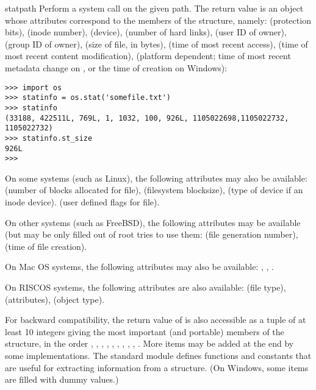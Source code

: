 \begin{funcdesc}{stat}{path}
Perform a  system call on the given path.  The
return value is an object whose attributes correspond to the members of
the  structure, namely:
 (protection bits),
 (inode number),
 (device),
 (number of hard links),
 (user ID of owner),
 (group ID of owner),
 (size of file, in bytes),
 (time of most recent access),
 (time of most recent content modification),
(platform dependent; time of most recent metadata change on \UNIX, or
the time of creation on Windows):

\begin{verbatim}
>>> import os
>>> statinfo = os.stat('somefile.txt')
>>> statinfo
(33188, 422511L, 769L, 1, 1032, 100, 926L, 1105022698,1105022732, 1105022732)
>>> statinfo.st_size
926L
>>>
\end{verbatim}


On some \UNIX{} systems (such as Linux), the following attributes may
also be available:
 (number of blocks allocated for file),
 (filesystem blocksize),
 (type of device if an inode device).
 (user defined flags for file).

On other \UNIX{} systems (such as FreeBSD), the following attributes
may be available (but may be only filled out of root tries to
use them:
 (file generation number),
 (time of file creation).

On Mac OS systems, the following attributes may also be available:
,
,
.

On RISCOS systems, the following attributes are also available:
 (file type),
 (attributes),
 (object type).

For backward compatibility, the return value of  is
also accessible as a tuple of at least 10 integers giving the most
important (and portable) members of the  structure, in the
order
,
,
,
,
,
,
,
,
,
.
More items may be added at the end by some implementations.
The standard module  defines
functions and constants that are useful for extracting information
from a  structure.
(On Windows, some items are filled with dummy values.)


\end{funcdesc}
